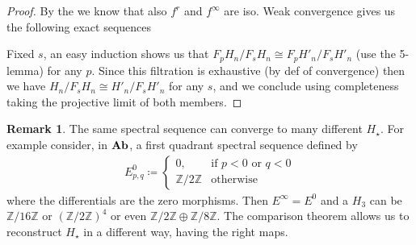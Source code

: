 \documentclass[a4paper]{article}
\newcommand{\Z}{ \mathbb{Z} }
\newcommand{\catname}[1]{{\normalfont\textbf{#1}}}
\newcommand{\Hs}{ H_{\star} }
\newcommand{\Ab}{\catname{Ab}}
\theoremstyle{plain}
\theoremstyle{definition}
\newtheorem{remark}{Remark}[thm]
\begin{document}
		\begin{proof}
			By the  we know that also $f^r$ and $f^{\infty}$ are iso. Weak convergence gives us the following exact sequences
			\begin{center}
			\end{center}
			Fixed $s$, an easy induction shows us that $F_pH_n/F_sH_n \cong F_pH'_n/F_sH'_n$ (use the 5-lemma) for any $p$. Since this filtration is exhaustive (by def of convergence) then we have $H_n/F_sH_n \cong H'_n/F_sH'_n$ for any $s$, and we conclude using completeness taking the projective limit of both members.
		\end{proof}
		\begin{remark}
			The same spectral sequence can converge to many different $\Hs$. For example consider, in $\Ab$,  a first quadrant spectral sequence defined by
			\begin{gather*}
				E^0_{p,q} \coloneqq 
				\begin{cases}
					0, & \text{if $p < 0$ or $q < 0$}\\
					\Z/2\Z & \text{otherwise}
				\end{cases}
			\end{gather*}
			where the differentials are the zero morphisms. Then $E^{\infty} = E^0$ and a $H_3$ can be $\Z/16\Z$ or $\left(\Z/2\Z\right)^4$ or even $\Z/2\Z \oplus \Z/8\Z$.
			The comparison theorem allows us to reconstruct $\Hs$ in a different way, having the right maps.
		\end{remark}
\end{document}
